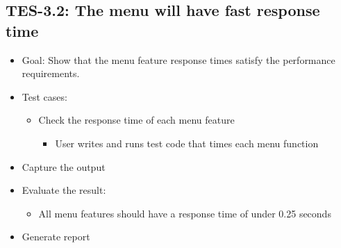 \subsection{TES-3.2: The menu will have fast response time }
\label{menu}
\begin{itemize}
\item Goal: Show that the menu feature response times satisfy the performance
requirements. 
\item Test cases: 

\begin{itemize}
\item Check the response time of each menu feature 

\begin{itemize}
\item User writes and runs test code that times each menu function 
\end{itemize}
\end{itemize}
\item Capture the output 
\item Evaluate the result: 

\begin{itemize}
\item All menu features should have a response time of under 0.25 seconds
\end{itemize}
\item Generate report 
\end{itemize}



